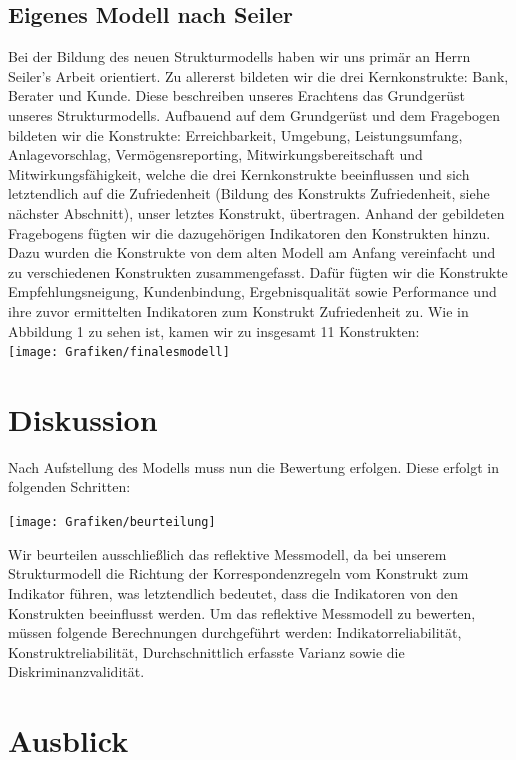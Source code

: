 \documentclass{article}\usepackage[]{graphicx}\usepackage[]{color}
\begin{document}
\subsection{Eigenes Modell nach Seiler}
Bei der Bildung des neuen Strukturmodells haben wir uns primär an Herrn Seiler's Arbeit orientiert. Zu allererst bildeten wir die drei Kernkonstrukte: Bank, Berater und Kunde. Diese beschreiben unseres Erachtens das Grundgerüst unseres Strukturmodells. Aufbauend auf dem Grundgerüst und dem Fragebogen bildeten wir die Konstrukte: Erreichbarkeit, Umgebung, Leistungsumfang, Anlagevorschlag, Vermögensreporting, Mitwirkungsbereitschaft und Mitwirkungsfähigkeit, welche die drei Kernkonstrukte beeinflussen und sich letztendlich auf die Zufriedenheit (Bildung des Konstrukts Zufriedenheit, siehe nächster Abschnitt), unser letztes Konstrukt, übertragen. Anhand der gebildeten Fragebogens fügten wir die dazugehörigen Indikatoren den Konstrukten hinzu.
Dazu wurden die Konstrukte von dem alten Modell am Anfang vereinfacht und zu verschiedenen Konstrukten zusammengefasst. Dafür fügten wir die Konstrukte Empfehlungsneigung, Kundenbindung, Ergebnisqualität sowie Performance und ihre zuvor ermittelten Indikatoren zum Konstrukt Zufriedenheit zu. Wie in Abbildung 1 zu sehen ist, kamen wir zu insgesamt 11 Konstrukten:\\


\hspace*{-4.8cm}\texttt{[image: Grafiken/finalesmodell]}




\section{Diskussion}%
Nach Aufstellung des Modells muss nun die Bewertung erfolgen. Diese erfolgt in folgenden Schritten:

\texttt{[image: Grafiken/beurteilung]}

Wir beurteilen ausschließlich das reflektive Messmodell, da bei unserem Strukturmodell die Richtung der Korrespondenzregeln vom Konstrukt zum Indikator führen, was letztendlich bedeutet, dass die Indikatoren von den Konstrukten beeinflusst werden. Um das reflektive Messmodell zu bewerten, müssen folgende Berechnungen durchgeführt werden: Indikatorreliabilität, Konstruktreliabilität, Durchschnittlich erfasste Varianz sowie die Diskriminanzvalidität.

\section{Ausblick}%





\appendix
\end{document}
